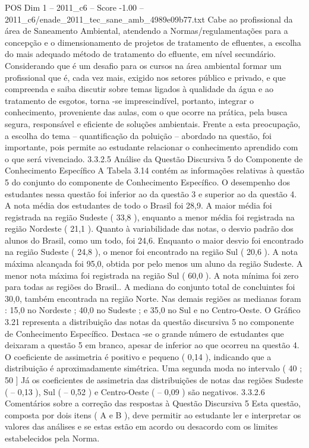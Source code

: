 \begin{textsample}{POS Dim 1 – 2011\_c6 – Score -1.00 – 2011\_c6/enade\_2011\_tec\_sane\_amb\_4989e09b77.txt}
Cabe ao profissional da área de Saneamento Ambiental, atendendo a Normas/regulamentações para a concepção e o dimensionamento de projetos de tratamento de efluentes, a escolha do mais adequado método de tratamento do efluente, em nível secundário.
Considerando que é um desafio para os cursos na área ambiental formar um profissional que é, cada vez mais, exigido nos setores público e privado, e que compreenda e saiba discutir sobre temas ligados à qualidade da água e ao tratamento de esgotos, torna -se imprescindível, portanto, integrar o conhecimento, proveniente das aulas, com o que ocorre na prática, pela busca segura, responsável e eficiente de soluções ambientais.
Frente a esta preocupação, a escolha do tema – quantificação da poluição – abordado na questão, foi importante, pois permite ao estudante relacionar o conhecimento aprendido com o que será vivenciado. 3.3.2.5 Análise da Questão Discursiva 5 do Componente de Conhecimento Específico A Tabela 3.14 contém as informações relativas à questão 5 do conjunto do componente de Conhecimento Específico.
O desempenho dos estudantes nessa questão foi inferior ao da questão 3 e superior ao da questão 4.
A nota média dos estudantes de todo o Brasil foi 28,9.
A maior média foi registrada na região Sudeste ( 33,8 ), enquanto a menor média foi registrada na região Nordeste ( 21,1 ).
Quanto à variabilidade das notas, o desvio padrão dos alunos do Brasil, como um todo, foi 24,6.
Enquanto o maior desvio foi encontrado na região Sudeste ( 24,8 ), o menor foi encontrado na região Sul ( 20,6 ).
A nota máxima alcançada foi 95,0, obtida por pelo menos um aluno da região Sudeste.
A menor nota máxima foi registrada na região Sul ( 60,0 ).
A nota mínima foi zero para todas as regiões do Brasil..
A mediana do conjunto total de concluintes foi 30,0, também encontrada na região Norte.
Nas demais regiões as medianas foram : 15,0 no Nordeste ; 40,0 no Sudeste ; e 35,0 no Sul e no Centro-Oeste.
O Gráfico 3.21 representa a distribuição das notas da questão discursiva 5 no componente de Conhecimento Específico.
Destaca -se o grande número de estudantes que deixaram a questão 5 em branco, apesar de inferior ao que ocorreu na questão 4.
O coeficiente de assimetria é positivo e pequeno ( 0,14 ), indicando que a distribuição é aproximadamente simétrica.
Uma segunda moda no intervalo ( 40 ; 50 ] Já os coeficientes de assimetria das distribuições de notas das regiões Sudeste ( – 0,13 ), Sul ( – 0,52 ) e Centro-Oeste ( – 0,09 ) são negativos. 3.3.2.6 Comentários sobre a correção das respostas à Questão Discursiva 5 Esta questão, composta por dois itens ( A e B ), deve permitir ao estudante ler e interpretar os valores das análises e se estas estão em acordo ou desacordo com os limites estabelecidos pela Norma.

\end{textsample}
